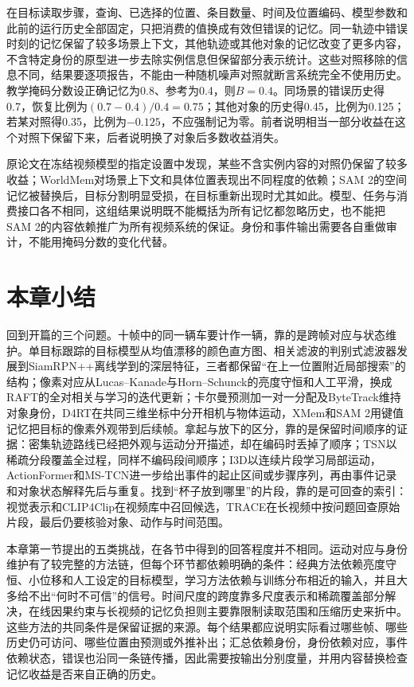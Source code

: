 在目标读取步骤，查询、已选择的位置、条目数量、时间及位置编码、模型参数和此前的运行历史全部固定，只把消费的值换成有效但错误的记忆。同一轨迹中错误时刻的记忆保留了较多场景上下文，其他轨迹或其他对象的记忆改变了更多内容，不含特定身份的原型进一步去除实例信息但保留部分表示统计。这些对照移除的信息不同，结果要逐项报告，不能由一种随机噪声对照就断言系统完全不使用历史。教学掩码分数设正确记忆为0.8、参考为0.4，则$B=0.4$。同场景的错误历史得0.7，恢复比例为$(0.7-0.4)/0.4=0.75$；其他对象的历史得0.45，比例为0.125；若某对照得0.35，比例为$-0.125$，不应强制记为零。前者说明相当一部分收益在这个对照下保留下来，后者说明换了对象后多数收益消失。

原论文在冻结视频模型的指定设置中发现，某些不含实例内容的对照仍保留了较多收益；WorldMem对场景上下文和具体位置表现出不同程度的依赖；SAM 2的空间记忆被替换后，目标分割明显受损，在目标重新出现时尤其如此。模型、任务与消费接口各不相同，这组结果说明既不能概括为所有记忆都忽略历史，也不能把SAM 2的内容依赖推广为所有视频系统的保证。身份和事件输出需要各自重做审计，不能用掩码分数的变化代替。

\section{本章小结}
\label{sec:vision-video-summary}

回到开篇的三个问题。十帧中的同一辆车要计作一辆，靠的是跨帧对应与状态维护。单目标跟踪的目标模型从均值漂移的颜色直方图、相关滤波的判别式滤波器发展到SiamRPN++离线学到的深层特征，三者都保留“在上一位置附近局部搜索”的结构；像素对应从Lucas--Kanade与Horn--Schunck的亮度守恒和人工平滑，换成RAFT的全对相关与学习的迭代更新；卡尔曼预测加一对一分配及ByteTrack维持对象身份，D4RT在共同三维坐标中分开相机与物体运动，XMem和SAM 2用键值记忆把目标的像素外观带到后续帧。拿起与放下的区分，靠的是保留时间顺序的证据：密集轨迹路线已经把外观与运动分开描述，却在编码时丢掉了顺序；TSN以稀疏分段覆盖全过程，同样不编码段间顺序；I3D以连续片段学习局部运动，ActionFormer和MS-TCN进一步给出事件的起止区间或步骤序列，再由事件记录和对象状态解释先后与重复。找到“杯子放到哪里”的片段，靠的是可回查的索引：视觉表示和CLIP4Clip在视频库中召回候选，TRACE在长视频中按问题回查原始片段，最后仍要核验对象、动作与时间范围。

本章第一节提出的五类挑战，在各节中得到的回答程度并不相同。运动对应与身份维护有了较完整的方法链，但每个环节都依赖明确的条件：经典方法依赖亮度守恒、小位移和人工设定的目标模型，学习方法依赖与训练分布相近的输入，并且大多给不出“何时不可信”的信号。时间尺度的跨度靠多尺度表示和稀疏覆盖部分解决，在线因果约束与长视频的记忆负担则主要靠限制读取范围和压缩历史来折中。这些方法的共同条件是保留证据的来源。每个结果都应说明实际看过哪些帧、哪些历史仍可访问、哪些位置由预测或外推补出；汇总依赖身份，身份依赖对应，事件依赖状态，错误也沿同一条链传播，因此需要按输出分别度量，并用内容替换检查记忆收益是否来自正确的历史。


